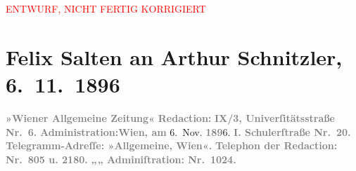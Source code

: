 
\begin{center}
            \textcolor{red}{ENTWURF, NICHT FERTIG KORRIGIERT}
                      \end{center}
            
         
         \renewcommand{\erwaehntePersonen}{Personen: Georg Hirschfeld}
         \renewcommand{\erwaehnteInstitutionen}{Institutionen: Wiener Allgemeine Zeitung}
         \renewcommand{\erwaehnteOrte}{Orte: Berlin, Schulerstraße, Universitätsstraße, Wien}
         \renewcommand{\erwaehnteWerke}{Werke: Die Mütter. Schauspiel in vier Acten}
               \section[Felix Salten an Arthur Schnitzler, 6. 11. 1896]{ Felix Salten an Arthur Schnitzler, 6. 11. 1896}\nopagebreak{}\rehead{ }\begin{ledgroupsized}[t]{13cm}\normalsize\beginnumbering \toendnotes[C]{\smallbreak\pagebreak[2]} 
\toendnotes[C]{\smallbreak}\pstart
           \noindent{}{\pb}\textcolor{gray}{\textbf{\textbf{»Wiener Allgemeine
                        Zeitung«}}}\pend
           \pstart
           \textcolor{gray}{\textbf{Redaction:}}\pend
           \pstart
           \textcolor{gray}{\textbf{\textbf{IX/3, Univerſitätsstraße Nr. 6.}}}\pend
           \pstart
           \textcolor{gray}{\textbf{Administration:}}\hfill \textcolor{gray}{\textbf{Wien, am}}{ }6. Nov. \textcolor{gray}{\textbf{189}}6.\pend
           \pstart
           \textcolor{gray}{\textbf{\textbf{I. Schulerſtraße Nr. 20. }}}\pend
           \pstart
           \textcolor{gray}{\textbf{Telegramm-Adreſſe: »Allgemeine, Wien«.}}\pend
           \pstart
           \textcolor{gray}{\textbf{Telephon der Redaction: Nr. 805 u. 2180.}}\pend
           \pstart
           \textcolor{gray}{\textbf{\hspace*{2.5em}„\hspace*{2.5em}„\hspace*{2.5em} Adminiſtration: Nr. 1024.}}\pend

\end{ledgroupsized}
